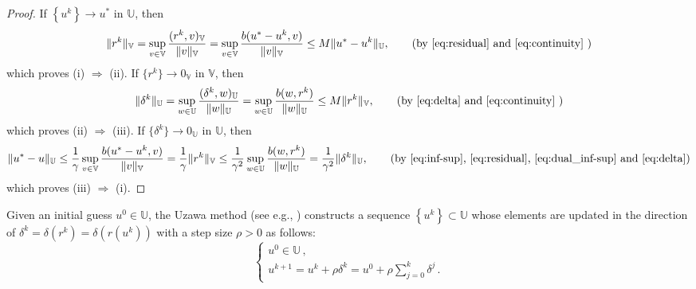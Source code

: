 \documentclass{article}
\theoremstyle{definition}
\begin{document}
\begin{proof}
    If $\left\{u^k\right\}\to u^*$ in $\mathbb U$, then 
    \begin{align}
    \|r^k\|_\mathbb V=\sup_{v\in\mathbb V}{(r^k,v)_\mathbb V\over\|v\|_\mathbb V}
    =\sup_{v\in\mathbb V}{b(u^*-u^k,v)\over\|v\|_\mathbb V}\leq M \|u^*-u^k\|_\mathbb U,\tag{by~\eqref{eq:residual}~and~\eqref{eq:continuity} }
    \end{align}
    which proves (i) $\Rightarrow$ (ii).
%
    If $\{r^k\}\to 0_\mathbb V$ in $\mathbb V$, then
    \begin{align}
    \|\delta^k\|_\mathbb U=\sup_{w\in\mathbb U}{(\delta^k,w)_\mathbb U\over\|w\|_\mathbb U}
    =\sup_{w \in\mathbb U}{b(w,r^k)\over\|w\|_\mathbb U}\leq M \|r^k\|_\mathbb V,
    \tag{by~\eqref{eq:delta}~and~\eqref{eq:continuity} }
    \end{align}
    which proves (ii) $\Rightarrow$ (iii).
If $\{\delta^k\}\to 0_\mathbb U$ in $\mathbb U$, then
    \begin{align}
    \|u^*-u\|_\mathbb U\leq {1\over\gamma}\sup_{v\in\mathbb V}{b(u^*-u^k,v)\over\|v\|_\mathbb V}
    = {1\over\gamma}\|r^k\|_\mathbb V\leq {1\over\gamma^2}\sup_{w\in\mathbb U}{b(w,r^k)\over\|w\|_\mathbb U}={1\over\gamma^2}\|\delta^k\|_\mathbb U, 
    \tag{by~\eqref{eq:inf-sup}, \eqref{eq:residual}, \eqref{eq:dual_inf-sup}~and~\eqref{eq:delta}}
    \end{align}
    which proves (iii) $\Rightarrow$ (i).
\end{proof}

Given an initial guess $u^0\in\mathbb U$, the Uzawa method (see e.g., \cite{uzawa1958iterative, HamdBBEV2025,BennyChackoBEV2025}) constructs a sequence $\left\{u^k\right\}\subset \mathbb U$ whose elements are updated in the direction of $\delta^k=\delta(r^k)=\delta(r(u^k))$ with a step size $\rho>0$ as follows:
\begin{equation}\label{eq:uzawa}
\left\{
\begin{array}{l}
u^0\in \mathbb U\,,\\
u^{k+1} = u^k+\rho\delta^k=u^0+\rho\displaystyle\sum_{j=0}^k\delta^j\,.
\end{array}
\right.
\end{equation}
\end{document}
